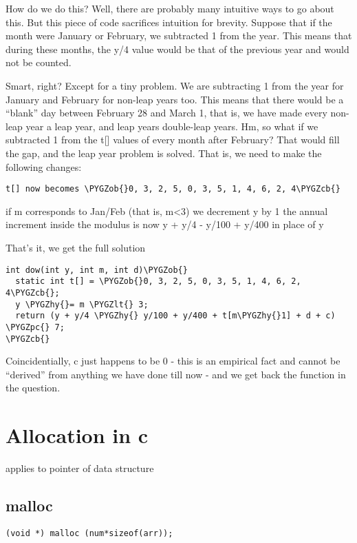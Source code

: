 \documentclass[letterpaper,10pt,english]{sphinxmanual}
\def\PYGZob{\char`\{}
\def\PYGZcb{\char`\}}
\def\PYGZlt{\char`\<}
\def\PYGZpc{\char`\%}
\def\PYGZhy{\char`\-}
\begin{document}
How  do we do this? Well, there are probably many intuitive ways to go about  this. But this piece of code sacrifices intuition for brevity. Suppose  that if the month were January or February, we subtracted 1 from the  year. This means that during these months, the y/4 value would be that  of the previous year and would not be counted.

Smart,  right? Except for a tiny problem. We are subtracting 1 from the year  for January and February for non-leap years too. This means that there  would be a ``blank'' day between February 28 and March 1, that is, we have  made every non-leap year a leap year, and leap years double-leap years.  Hm, so what if we subtracted 1 from the t{[}{]} values of every month after  February? That would fill the gap, and the leap year problem is solved.  That is, we need to make the following changes:

\begin{Verbatim}[commandchars=\\\{\}]
t[] now becomes \PYGZob{}0, 3, 2, 5, 0, 3, 5, 1, 4, 6, 2, 4\PYGZcb{}
\end{Verbatim}

if m corresponds to Jan/Feb (that is, m\textless{}3) we decrement y by 1
the annual increment inside the modulus is now y + y/4 - y/100 + y/400 in place of y

That's it, we get the full solution

\begin{Verbatim}[commandchars=\\\{\}]
int dow(int y, int m, int d)\PYGZob{}
  static int t[] = \PYGZob{}0, 3, 2, 5, 0, 3, 5, 1, 4, 6, 2, 4\PYGZcb{};
  y \PYGZhy{}= m \PYGZlt{} 3;
  return (y + y/4 \PYGZhy{} y/100 + y/400 + t[m\PYGZhy{}1] + d + c) \PYGZpc{} 7;
\PYGZcb{}
\end{Verbatim}

Coincidentially, c just happens to be 0 - this is an empirical fact and cannot be ``derived'' from anything we have done till now - and we get back the function in the question.


\chapter{Allocation in c}
\label{allocation:allocation-in-c}\label{allocation::doc}
applies to pointer of data structure


\section{malloc}
\label{allocation:malloc}
\begin{Verbatim}[commandchars=\\\{\}]
(void *) malloc (num*sizeof(arr));
\end{Verbatim}
\end{document}
